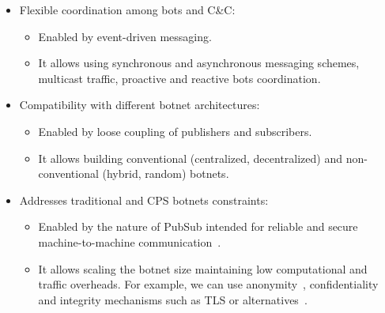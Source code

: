 \documentclass[sigconf]{acmart}
\makeatletter
\newcommand{\CC}{C\&C\@\xspace}
\makeatother
\begin{document}
\begin{itemize}
    \item Flexible coordination among bots and \CC\@:
    \begin{itemize}
        \item Enabled by event-driven messaging.
        \item It allows using synchronous and asynchronous messaging schemes,
            multicast traffic, proactive and reactive bots coordination.
    \end{itemize}
    \item Compatibility with different botnet architectures:
    \begin{itemize}
        \item Enabled by loose coupling of publishers and subscribers.
        \item It allows building conventional (centralized, decentralized) and
            non-conventional (hybrid, random) botnets.
    \end{itemize}
    \item Addresses traditional and CPS botnets constraints:
    \begin{itemize}
        \item Enabled by the nature of PubSub intended for
            reliable and secure machine-to-machine
            communication~\cite{carzaniga2001design,pietzuch2002hermes}.
        \item It allows scaling the botnet size maintaining
            low computational and traffic overheads. For example, we can use
            anonymity~\cite{daubert2016anonpubsub},
            confidentiality and integrity mechanisms such as TLS
            or alternatives~\cite{ion2010supporting}.
    \end{itemize}
\end{itemize}

\end{document}
